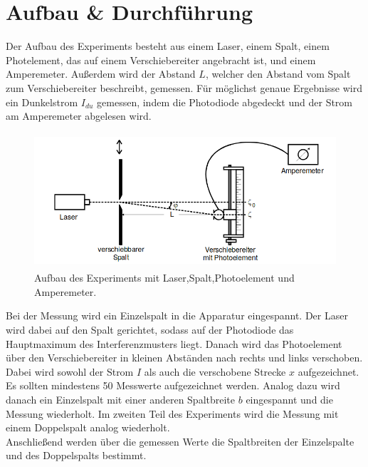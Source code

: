\section{Aufbau \& Durchführung}

Der Aufbau des Experiments besteht aus einem Laser, einem Spalt, einem Photelement, das auf einem Verschiebereiter angebracht ist, und einem Amperemeter.
Außerdem wird der Abstand $L$, welcher den Abstand vom Spalt zum Verschiebereiter beschreibt, gemessen.
Für möglichst genaue Ergebnisse wird ein Dunkelstrom $I_{du}$ gemessen, indem die Photodiode abgedeckt und der Strom am Amperemeter abgelesen wird.

\begin{figure}[H]
    \centering
    \includegraphics[height=5cm]{Aufbau/Aufbau.pdf}
    \caption{Aufbau des Experiments mit Laser,Spalt,Photoelement und Amperemeter. \cite{1}}
    \label{fig:Aufbau}
\end{figure}

Bei der Messung wird ein Einzelspalt in die Apparatur eingespannt.
Der Laser wird dabei auf den Spalt gerichtet, sodass auf der Photodiode das Hauptmaximum des Interferenzmusters liegt.
Danach wird das Photoelement über den Verschiebereiter in kleinen Abständen nach rechts und links verschoben.
Dabei wird sowohl der Strom $I$ als auch die verschobene Strecke $x$ aufgezeichnet.
Es sollten mindestens 50 Messwerte aufgezeichnet werden.
Analog dazu wird danach ein Einzelspalt mit einer anderen Spaltbreite $b$ eingespannt und die Messung wiederholt.
Im zweiten Teil des Experiments wird die Messung mit einem Doppelspalt analog wiederholt. \\
Anschließend werden über die gemessen Werte die Spaltbreiten der Einzelspalte und des Doppelspalts bestimmt.
